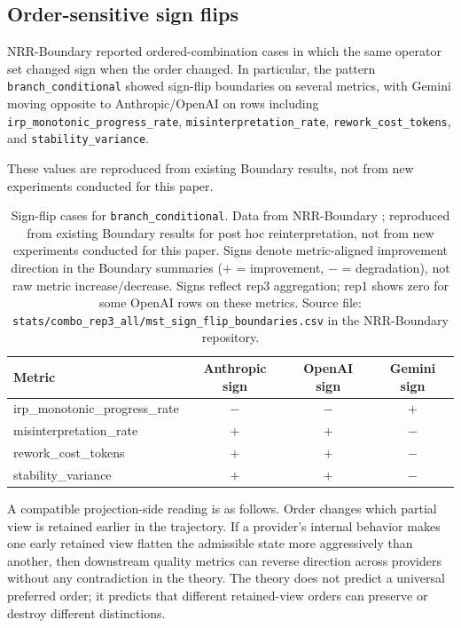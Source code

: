 \documentclass[11pt,a4paper]{article}
\begin{document}
\subsection{Order-sensitive sign flips}

NRR-Boundary \cite{saito2026boundary} reported ordered-combination cases in which the same operator set changed sign when the order changed. In particular, the pattern \texttt{branch\_conditional} showed sign-flip boundaries on several metrics, with Gemini moving opposite to Anthropic/OpenAI on rows including \texttt{irp\_monotonic\_progress\_rate}, \texttt{misinterpretation\_rate}, \texttt{rework\_cost\_tokens}, and \texttt{stability\_variance}.

These values are reproduced from existing Boundary results, not from new experiments conducted for this paper.

\begin{table}[h]
\centering
\small
\begin{tabular}{p{5.2cm}ccc}
\toprule
Metric & Anthropic sign & OpenAI sign & Gemini sign \\
\midrule
irp\_monotonic\_progress\_rate & $-$ & $-$ & $+$ \\
misinterpretation\_rate & $+$ & $+$ & $-$ \\
rework\_cost\_tokens & $+$ & $+$ & $-$ \\
stability\_variance & $+$ & $+$ & $-$ \\
\bottomrule
\end{tabular}
\caption{Sign-flip cases for \texttt{branch\_conditional}. Data from NRR-Boundary \cite{saito2026boundary}; reproduced from existing Boundary results for post hoc reinterpretation, not from new experiments conducted for this paper. Signs denote metric-aligned improvement direction in the Boundary summaries ($+$ = improvement, $-$ = degradation), not raw metric increase/decrease. Signs reflect rep3 aggregation; rep1 shows zero for some OpenAI rows on these metrics. Source file: \texttt{stats/combo\_rep3\_all/mst\_sign\_flip\_boundaries.csv} in the NRR-Boundary repository.}
\label{tab:boundary_signflip}
\end{table}

A compatible projection-side reading is as follows. Order changes which partial view is retained earlier in the trajectory. If a provider's internal behavior makes one early retained view flatten the admissible state more aggressively than another, then downstream quality metrics can reverse direction across providers without any contradiction in the theory. The theory does not predict a universal preferred order; it predicts that different retained-view orders can preserve or destroy different distinctions.
\end{document}
